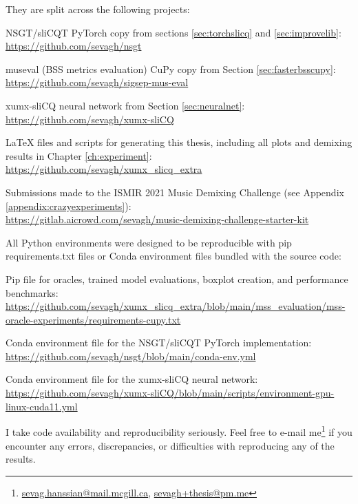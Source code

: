\documentclass[report.tex]{subfiles}
\begin{document}
\begin{appendices}
They are split across the following projects:
\begin{tight_itemize}
	\item
		NSGT/sliCQT PyTorch copy from sections \ref{sec:torchslicq} and \ref{sec:improvelib}:\\
		\url{https://github.com/sevagh/nsgt}
	\item
		museval (BSS metrics evaluation) CuPy copy from Section \ref{sec:fasterbsscupy}:\\
		\url{https://github.com/sevagh/sigsep-mus-eval}
	\item
		xumx-sliCQ neural network from Section \ref{sec:neuralnet}:\\
		\url{https://github.com/sevagh/xumx-sliCQ}
	\item
		LaTeX files and scripts for generating this thesis, including all plots and demixing results in Chapter \ref{ch:experiment}:\\
		\url{https://github.com/sevagh/xumx_slicq_extra}
	\item
		Submissions made to the ISMIR 2021 Music Demixing Challenge (see Appendix \ref{appendix:crazyexperiments}):\\
		\url{https://gitlab.aicrowd.com/sevagh/music-demixing-challenge-starter-kit}
\end{tight_itemize}

All Python environments were designed to be reproducible with pip requirements.txt files or Conda environment files bundled with the source code:

\begin{tight_itemize}
	\item
		Pip file for oracles, trained model evaluations, boxplot creation, and performance benchmarks:\\
		\url{https://github.com/sevagh/xumx_slicq_extra/blob/main/mss_evaluation/mss-oracle-experiments/requirements-cupy.txt}
	\item
		Conda environment file for the NSGT/sliCQT PyTorch implementation:\\
		\url{https://github.com/sevagh/nsgt/blob/main/conda-env.yml}
	\item
		Conda environment file for the xumx-sliCQ neural network:\\
		\url{https://github.com/sevagh/xumx-sliCQ/blob/main/scripts/environment-gpu-linux-cuda11.yml}
\end{tight_itemize}

I take code availability and reproducibility seriously. Feel free to e-mail me\footnote{\href{mailto:sevag.hanssian@mail.mcgill.ca}{sevag.hanssian@mail.mcgill.ca}, \href{mailto:sevagh+thesis@pm.me}{sevagh+thesis@pm.me}} if you encounter any errors, discrepancies, or difficulties with reproducing any of the results.


\end{appendices}
\end{document}
